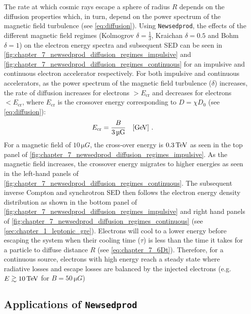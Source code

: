 The rate at which cosmic rays escape a sphere of radius $R$ depends on the diffusion properties which, in turn, depend on the power spectrum of the magnetic field turbulence (see \autoref{eq:diffusion}). Using {\tt Newsedprod}, the effects of the different magnetic field regimes (Kolmogrov $\delta=\frac{1}{3}$, Kraichan $\delta=0.5$ and Bohm $\delta=1$) on the electron energy spectra and subsequent SED can be seen in \autoref{fig:chapter_7_newsedprod_diffusion_regimes_impulsive} and \autoref{fig:chapter_7_newsedprod_diffusion_regimes_continuous} for an impulsive and continuous electron accelerator respectively.
\newpar 
For both impulsive and continuous accelerators, as the power spectrum of the magnetic field turbulence ($\delta$) increases, the rate of diffusion increases for electrons $>E_\text{cr}$ and decreases for electrons $<E_\text{cr}$, where $E_\text{cr}$ is the crossover energy corresponding to $D=\chi D_0$ (see \autoref{eq:diffusion}):
\begin{equation}
    \begin{aligned}
        E_\text{cr}&=\frac{B}{3\,\si{\micro G}}\quad\qty[\GeV]\text{ .}
    \end{aligned}
\end{equation}
\noindent For a magnetic field of $10\,\si{\micro G}$, the cross-over energy is $0.3\,\TeV$ as seen in the top panel of \autoref{fig:chapter_7_newsedprod_diffusion_regimes_impulsive}. As the magnetic field increases, the crossover energy migrates to higher energies as seen in the left-hand panels of \autoref{fig:chapter_7_newsedprod_diffusion_regimes_continuous}. The subsequent inverse Compton and synchrotron SED then follows the electron energy density distribution as shown in the bottom panel of \autoref{fig:chapter_7_newsedprod_diffusion_regimes_impulsive} and right hand panels of \autoref{fig:chapter_7_newsedprod_diffusion_regimes_continuous} (see \autoref{sec:chapter_1_leptonic_gre}).
\newpar 
Electrons will cool to a lower energy before escaping the system when their cooling time ($\tau$) is less than the time it takes for a particle to diffuse distance $R$ (see \autoref{eq:chapter_7_6Dt}). Therefore, for a continuous source, electrons with high energy reach a steady state where radiative losses and escape losses are balanced by the injected electrons (e.g. $E\gtrsim 10\,\TeV$ for $B=50\,\si{\micro G}$)

\subsection{Applications of {\tt Newsedprod}}

